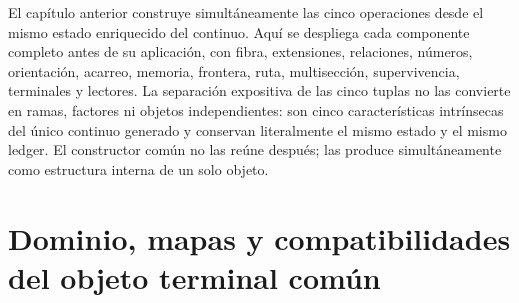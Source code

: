 
El capítulo anterior construye simultáneamente las cinco operaciones desde el mismo
estado enriquecido del continuo. Aquí se despliega cada componente completo antes de
su aplicación, con fibra, extensiones, relaciones, números, orientación, acarreo,
memoria, frontera, ruta, multisección, supervivencia, terminales y lectores. La
separación expositiva de las cinco tuplas no las convierte en ramas, factores ni
objetos independientes: son cinco características intrínsecas del único continuo
generado y conservan literalmente el mismo estado y el mismo ledger. El constructor
común no las reúne después; las produce simultáneamente como estructura interna de
un solo objeto.

\section{Dominio, mapas y compatibilidades del objeto terminal común}

